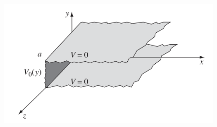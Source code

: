 \documentclass[a4paper,12pt]{report}
\begin{document}
	\begin{figure}[H]
		\centering
		\includegraphics[scale=0.25]{lap1}
		\caption[]{\label{lap1}}
	\end{figure}
	
	
	
	
	
	
	
\end{document}
